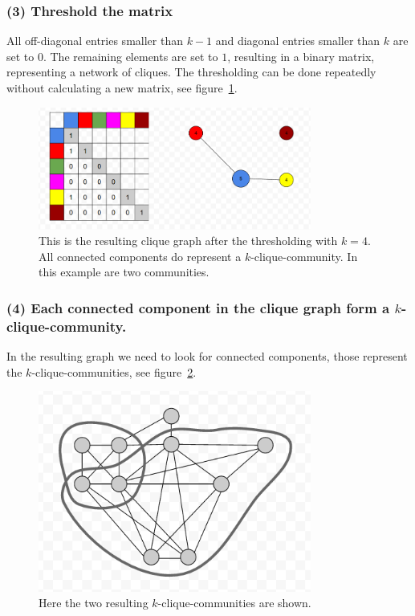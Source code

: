 \documentclass[runningheads,a4paper]{llncs}
\begin{document}
\subsubsection{(3) Threshold the matrix}
All off-diagonal entries smaller than $k-1$ and diagonal entries smaller than $k$ are set to $0$.
The remaining elements are set to $1$, resulting in a binary matrix, representing a network of cliques. The thresholding can be done repeatedly without calculating a new matrix, see figure~\ref{fig:matrixtrashed}.

\begin{figure}
\begin{center}
	\includegraphics[width=0.8\textwidth]{matrixtrashed}
		\caption{This is the resulting clique graph after the thresholding with $k=4$. All connected components do represent a $k$-clique-community. In this example are two communities.}
		\label{fig:matrixtrashed}
\end{center}
\end{figure}
 
\subsubsection{(4) Each connected component in the clique graph form a $k$-clique-community.}
In the resulting graph we need to look for connected components, those represent the $k$-clique-communities, see figure~\ref{fig:result}.

\begin{figure}
\begin{center}
	\includegraphics[width=0.8\textwidth]{result}
		\caption{Here the two resulting $k$-clique-communities are shown.}
		\label{fig:result}
\end{center}
\end{figure}
\end{document}
